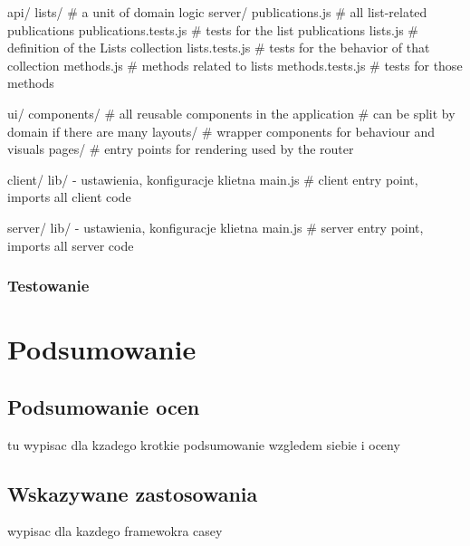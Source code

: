 \documentclass[12pt]{report}
\begin{document}
  api/
    lists/                     # a unit of domain logic
      server/
        publications.js        # all list-related publications
        publications.tests.js  # tests for the list publications
      lists.js                 # definition of the Lists collection
      lists.tests.js           # tests for the behavior of that collection
      methods.js               # methods related to lists
      methods.tests.js         # tests for those methods

  ui/
    components/                # all reusable components in the application
                               # can be split by domain if there are many
    layouts/                   # wrapper components for behaviour and visuals
    pages/                     # entry points for rendering used by the router

client/
  lib/ - ustawienia, konfiguracje klietna
  main.js                      # client entry point, imports all client code

server/
  lib/ - ustawienia, konfiguracje klietna
  main.js                      # server entry point, imports all server code

    \subsection{Testowanie}
    
\chapter{Podsumowanie}
  \section{Podsumowanie ocen}
  tu wypisac dla kzadego krotkie podsumowanie wzgledem siebie i oceny
  \section{Wskazywane zastosowania}
  wypisac dla kazdego framewokra casey

\end{document}
